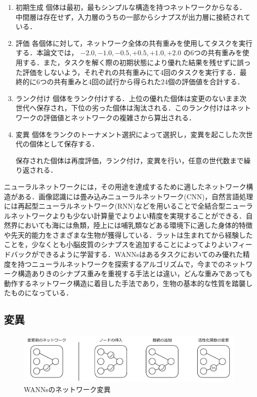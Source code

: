 \begin{enumerate}
    \item 初期生成
    個体は最初，最もシンプルな構造を持つネットワークからなる．中間層は存在せず，入力層のうちの一部からシナプスが出力層に接続されている．

    \item 評価
    各個体に対して，ネットワーク全体の共有重みを使用してタスクを実行する．本論文では， $ -2.0, -1.0, -0.5, +0.5, +1.0, +2.0 $ の6つの共有重みを使用する．また，タスクを解く際の初期状態により優れた結果を残せずに誤った評価をしないよう，それぞれの共有重みにて4回のタスクを実行する．最終的に6つの共有重みと4回の試行から得られた24個の評価値を合計する．

    \item ランク付け
    個体をランク付けする．上位の優れた個体は変更のないまま次世代へ保存され，下位の劣った個体は淘汰される．このランク付けはネットワークの評価値とネットワークの複雑さから算出される．

    \item 変異
    個体をランクのトーナメント選択\cite{遺伝的アルゴリズム}によって選択し，変異を起こした次世代の個体として保存する．

    保存された個体は再度評価，ランク付け，変異を行い，任意の世代数まで繰り返される．
\end{enumerate}

ニューラルネットワークには，その用途を達成するために適したネットワーク構造がある．画像認識には畳み込みニューラルネットワーク(CNN)，自然言語処理には再起型ニューラルネットワーク(RNN)などを用いることで全結合型ニューラルネットワークよりも少ない計算量でよりよい精度を実現することができる\cite{深層学習}．自然界においても海には魚類，陸上には哺乳類などある環境下に適した身体的特徴や先天的能力をさまざまな生物が獲得している\cite{先天的能力}．ラットは生まれてから経験したことを，少なくとも小脳皮質のシナプスを追加することによってよりよいフィードバックができるように学習する\cite{シナプス学習}．WANNsはあるタスクにおいてのみ優れた精度を持つニューラルネットワークを探索するアルゴリズムで，今までのネットワーク構造ありきのシナプス重みを重視する手法とは違い，どんな重みであっても動作するネットワーク構造に着目した手法であり，生物の基本的な性質を踏襲したものになっている．

\subsection{変異}

\begin{figure}[h]
    \begin{center}
        \includegraphics[scale=0.8]{img/vary.pdf}
        \caption{WANNsのネットワーク変異}
    \end{center}
\end{figure}

